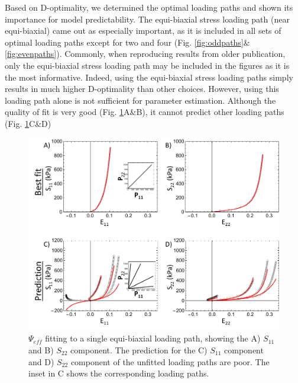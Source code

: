     Based on D-optimality, we determined the optimal loading paths and shown its importance for model predictability. The equi-biaxial stress loading path (near equi-biaxial) came out as especially important, as it is included in all sets of optimal loading paths except for two and four (Fig. \ref{fig:oddpaths}\&\ref{fig:evenpaths}). Commonly, when reproducing results from older publication, only the equi-biaxial stress loading path may be included in the figures as it is the most informative. Indeed, using the equi-biaxial stress loading paths simply results in much higher D-optimality than other choices. However, using this loading path alone is not sufficient for parameter estimation. Although the quality of fit is very good (Fig. \ref{fig:effequifit}A\&B), it cannot predict other loading paths (Fig. \ref{fig:effequifit}C\&D) 
    
\begin{figure}[!hbtp]
\centering
\includegraphics[width=6.5in]{Figures/effequifit}
\caption{$\Psi_{eff}$ fitting to a single equi-biaxial loading path, showing the A) $S_{11}$ and B) $S_{22}$ component. The prediction for the C) $S_{11}$ component and D) $S_{22}$ component of the unfitted loading paths are poor. The inset in C shows the corresponding loading paths.}
\label{fig:effequifit}
\end{figure} 

